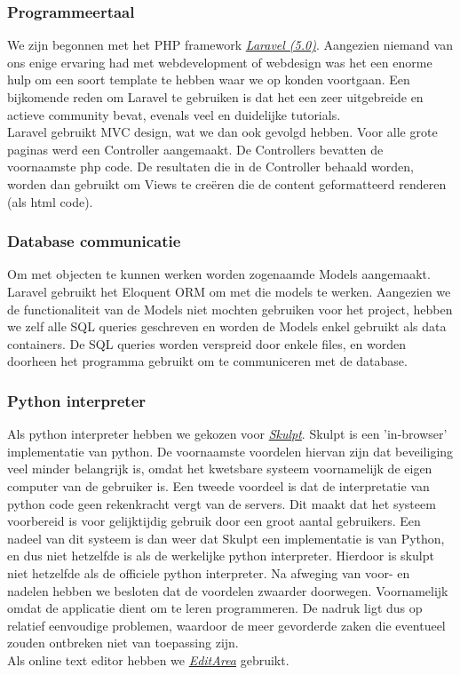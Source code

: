 \subsubsection{Programmeertaal}
We zijn begonnen met het PHP framework \href{http://laravel.com/}{\emph{Laravel (5.0)}}.
Aangezien niemand van ons enige ervaring had met webdevelopment of webdesign was het een
enorme hulp om een soort template te hebben waar we op konden voortgaan. Een bijkomende reden
om Laravel te gebruiken is dat het een zeer uitgebreide en actieve community bevat, evenals veel en
duidelijke tutorials. \\
Laravel gebruikt MVC design, wat we dan ook gevolgd hebben. Voor alle grote paginas
werd een Controller aangemaakt. De Controllers bevatten de voornaamste php code. De resultaten die in de
Controller behaald worden, worden dan gebruikt om Views te cre\"{e}ren die de content geformatteerd renderen (als html code).

\subsubsection{Database communicatie}
Om met objecten te kunnen werken worden zogenaamde Models aangemaakt. Laravel gebruikt het Eloquent ORM om met die models
te werken. Aangezien we de functionaliteit van de Models niet mochten gebruiken voor het project,
hebben we zelf alle SQL queries geschreven en worden de Models enkel gebruikt als data containers.
De SQL queries worden verspreid door enkele files, en worden doorheen het programma gebruikt om te communiceren
met de database.

\subsubsection{Python interpreter}
Als python interpreter hebben we gekozen voor \href{http://www.skulpt.org/}{\emph{Skulpt}}.
Skulpt is een 'in-browser' implementatie van python. De voornaamste voordelen hiervan zijn dat
beveiliging veel minder belangrijk is, omdat het kwetsbare systeem voornamelijk de eigen computer
van de gebruiker is. Een tweede voordeel is dat de interpretatie van python code geen rekenkracht vergt van
de servers. Dit maakt dat het systeem voorbereid is voor gelijktijdig gebruik door een groot aantal gebruikers.
Een nadeel van dit systeem is dan weer dat Skulpt een implementatie is van Python, en dus niet hetzelfde is als de
werkelijke python interpreter. Hierdoor is skulpt niet hetzelfde als de officiele python interpreter. Na
afweging van voor- en nadelen hebben we besloten dat de voordelen zwaarder doorwegen. Voornamelijk omdat
de applicatie dient om te leren programmeren. De nadruk ligt dus op relatief eenvoudige problemen, waardoor
de meer gevorderde zaken die eventueel zouden ontbreken niet van toepassing zijn. \\
Als online text editor hebben we \href{http://www.cdolivet.com/editarea/}{\emph{EditArea}} gebruikt.

